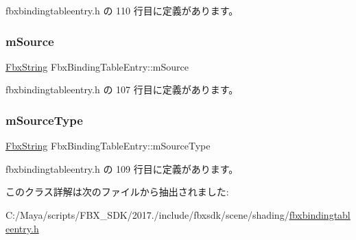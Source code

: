  fbxbindingtableentry.\+h の 110 行目に定義があります。

\mbox{\label{class_fbx_binding_table_entry_a9fe2b8742a77e290a15287b4dbc1df74}} 
\subsubsection{\texorpdfstring{m\+Source}{mSource}}
{\footnotesize\ttfamily \hyperlink{class_fbx_string}{Fbx\+String} Fbx\+Binding\+Table\+Entry\+::m\+Source\hspace{0.3cm}{\ttfamily [protected]}}



 fbxbindingtableentry.\+h の 107 行目に定義があります。

\mbox{\label{class_fbx_binding_table_entry_ad2f8a7934ffbeb6eb7bc83fa5f5e8d06}} 
\subsubsection{\texorpdfstring{m\+Source\+Type}{mSourceType}}
{\footnotesize\ttfamily \hyperlink{class_fbx_string}{Fbx\+String} Fbx\+Binding\+Table\+Entry\+::m\+Source\+Type\hspace{0.3cm}{\ttfamily [protected]}}



 fbxbindingtableentry.\+h の 109 行目に定義があります。



このクラス詳解は次のファイルから抽出されました\+:\begin{DoxyCompactItemize}
\item 
C\+:/\+Maya/scripts/\+F\+B\+X\+\_\+\+S\+D\+K/2017./include/fbxsdk/scene/shading/\hyperlink{fbxbindingtableentry_8h}{fbxbindingtableentry.\+h}\end{DoxyCompactItemize}
